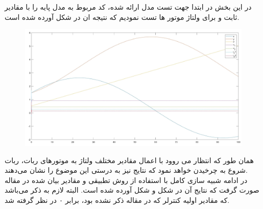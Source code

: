 در این بخش در ابتدا جهت تست مدل ارائه شده، کد مربوط به مدل پایه را با مقادیر ثابت  و  برای ولتاژ موتور ها تست نمودیم که نتیجه ان در شکل  آورده شده است.
\begin{figure}[h]
	\centering
	\includegraphics[width=15cm]{img/test1.jpg}
\end{figure}
همان طور که انتظار می روود با اعمال مقادیر مختلف ولتاژ به موتورهای ربات، ربات شروع به چرخیدن خواهد نمود که نتایج نیز به درستی این موضوع را نشان می‌دهند.\\
در ادامه شبیه سازی کامل با استفاده از روش تطبیقی و مقادیر بیان شده در مقاله صورت گرفت که نتایج آن در شکل  و شکل  آورده شده است. البته لازم به ذکر می‌باشد که مقادیر اولیه کنترلر که در مقاله ذکر نشده بود، برابر ۰ در نظر گرفته شد. \\
